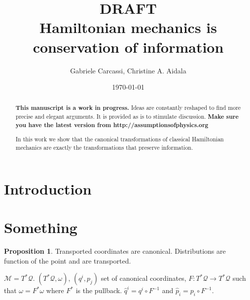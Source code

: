 \documentclass[smallextended]{svjour3}
\numberwithin{equation}{section}
\theoremstyle{definition}
\newtheorem{prop}[equation]{Proposition}
\newcommand{\journal}[1]{\ifjournal#1\fi}
\newcommand{\arxiv}[1]{\ifjournal\else#1\fi}
\begin{document}
\title{DRAFT \\ Hamiltonian mechanics is conservation of information}
\author{Gabriele Carcassi, Christine A. Aidala}

\ifjournal
\else
\fi


\date{\today}

\journal{\maketitle}
	
\begin{abstract}
\textbf{This manuscript is a work in progress.} Ideas are constantly reshaped to find more precise and elegant arguments. It is provided as is to stimulate discussion.  \textbf{Make sure you have the latest version from http://assumptionsofphysics.org}

In this work we show that the canonical transformations of classical Hamiltonian mechanics are exactly the transformations that preserve information.
\end{abstract}

\arxiv{\maketitle}

\section{Introduction}

\section{Something}

\begin{prop}
	Transported coordinates are canonical. Distributions are function of the point and are transported.
\end{prop}

$\mathcal{M} = T^*\mathcal{Q}$. $(T^*\mathcal{Q}, \omega)$, $(q^i, p_j)$ set of canonical coordinates, $F: T^*\mathcal{Q} \rightarrow T^*\mathcal{Q}$ such that $\omega = F^* \omega$ where $F^*$ is the pullback. $\hat{q}^i = q^i \circ F^{-1}$ and $\hat{p}_i = p_i \circ F^{-1}$.
\end{document}

